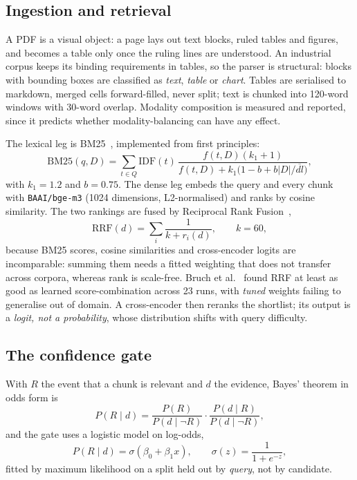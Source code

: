 \documentclass[conference]{IEEEtran}
\begin{document}
\subsection{Ingestion and retrieval}

A PDF is a visual object: a page lays out text blocks, ruled tables and
figures, and becomes a table only once the ruling lines are understood. An
industrial corpus keeps its binding requirements in tables, so the parser is
structural: blocks with bounding boxes are classified as \emph{text},
\emph{table} or \emph{chart}. Tables are serialised to markdown, merged cells
forward-filled, never split; text is chunked into 120-word windows with
30-word overlap. Modality composition is measured and reported, since it
predicts whether modality-balancing can have any effect.

The lexical leg is BM25~\cite{robertson2004prf}, implemented from first
principles:
\begin{equation}
\mathrm{BM25}(q,D)=\sum_{t\in Q}\mathrm{IDF}(t)\,
\frac{f(t,D)(k_1+1)}{f(t,D)+k_1\big(1-b+b|D|/\overline{dl}\big)},
\label{eq:bm25}
\end{equation}
with $k_1=1.2$ and $b=0.75$. The dense leg embeds the query and every chunk
with \texttt{BAAI/bge-m3} (1024 dimensions, L2-normalised) and ranks by
cosine similarity. The two rankings are fused by Reciprocal Rank
Fusion~\cite{cormack2009rrf},
\begin{equation}
\mathrm{RRF}(d)=\sum_i \frac{1}{k+r_i(d)},\qquad k=60,
\label{eq:rrf}
\end{equation}
because BM25 scores, cosine similarities and cross-encoder logits are
incomparable: summing them needs a fitted weighting that does not transfer
across corpora, whereas rank is scale-free. Bruch et
al.~\cite{bruch2023fusion} found RRF at least as good as learned
score-combination across 23 runs, with \emph{tuned} weights failing to
generalise out of domain. A cross-encoder then reranks the shortlist; its
output is a \emph{logit, not a probability}, whose distribution shifts with
query difficulty.

\subsection{The confidence gate}

With $R$ the event that a chunk is relevant and $d$ the evidence, Bayes'
theorem in odds form is
\begin{equation}
P(R\mid d)=\frac{P(R)}{P(d\mid\neg R)}\cdot\frac{P(d\mid R)}{P(d\mid\neg R)},
\label{eq:bayes}
\end{equation}
and the gate uses a logistic model on log-odds,
\begin{equation}
P(R\mid d)=\sigma(\beta_0+\beta_1 x),\qquad \sigma(z)=\frac{1}{1+e^{-z}},
\label{eq:posterior}
\end{equation}
fitted by maximum likelihood on a split held out by \emph{query}, not by
candidate.
\end{document}
